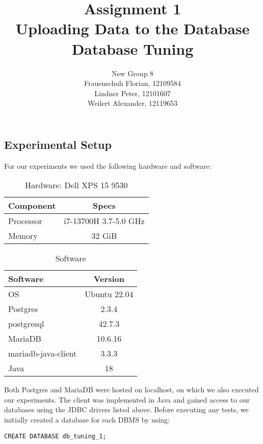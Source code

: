 \documentclass[11pt]{scrartcl}
\title{
  \textbf{\large Assignment 1} \\
  Uploading Data to the Database \\
  {\large Database Tuning}}
\author{
  New Group 8 \\
  \large Frauenschuh Florian, 12109584 \\
  \large Lindner Peter, 12101607 \\
  \large Weilert Alexander, 12119653
}
\begin{document}
\maketitle

\subsection*{Experimental Setup}

For our experiments we used the following hardware and software:

\begin{multicols}{2}
  \begin{table}[H]
    \centering
    \begin{tabular}{lc}
      \toprule
      Component & Specs \\
      \midrule
      Processor & i7-13700H 3.7-5.0 GHz \\
      Memory & 32 GiB \\
      \bottomrule
    \end{tabular}
    \caption{Hardware: Dell XPS 15 9530}
    \label{table:hardware}
  \end{table}

  \columnbreak

  \begin{table}[H]
    \centering
    \begin{tabular}{lc}
      \toprule
      Software & Version \\
      \midrule
      OS & Ubuntu 22.04 \\
      Postgres & 2.3.4 \\
      postgresql & 42.7.3 \\
      MariaDB & 10.6.16 \\
      mariadb-java-client & 3.3.3 \\
      Java & 18 \\
      \bottomrule
    \end{tabular}
    \caption{Software}
    \label{table:software_versions}
  \end{table}
\end{multicols}

Both Postgres and MariaDB were hosted on localhost, on which we also executed our experiments.
The client was implemented in Java and gained access to our databases using the JDBC drivers listed above.
Before executing any tests, we initially created a database for each DBMS by using:

\begin{lstlisting}[caption={Create database}]
CREATE DATABASE db_tuning_1;
\end{lstlisting}
\end{document}
